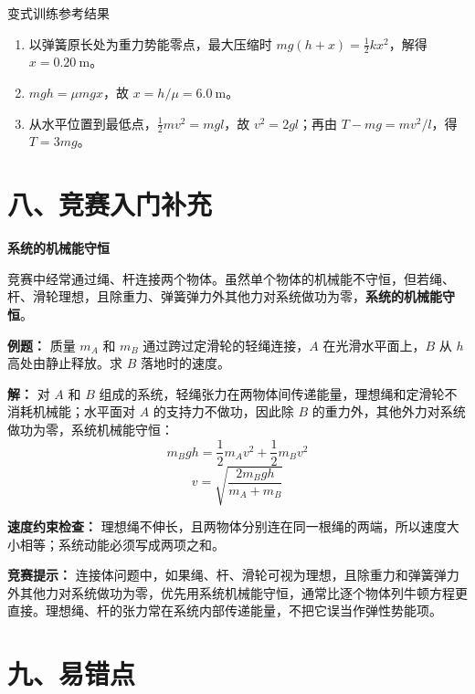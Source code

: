 \begin{learningbox}{变式训练参考结果}
\begin{enumerate}[itemsep=0.45em,topsep=0.3em,parsep=0pt]
  \item 以弹簧原长处为重力势能零点，最大压缩时
  $mg(h+x)=\frac12kx^2$，解得 $x=0.20\ \mathrm m$。
  \item $mgh=\mu mgx$，故 $x=h/\mu=6.0\ \mathrm m$。
  \item 从水平位置到最低点，$\frac12mv^2=mgl$，故 $v^2=2gl$；再由
  $T-mg=mv^2/l$，得 $T=3mg$。
\end{enumerate}
\end{learningbox}

\section*{八、竞赛入门补充}

\begin{competitionbox}
\textbf{系统的机械能守恒}

竞赛中经常通过绳、杆连接两个物体。虽然单个物体的机械能不守恒，但若绳、杆、滑轮理想，且除重力、弹簧弹力外其他力对系统做功为零，\textbf{系统的机械能守恒}。

\textbf{例题：} 质量 $m_A$ 和 $m_B$ 通过跨过定滑轮的轻绳连接，$A$ 在光滑水平面上，$B$ 从 $h$ 高处由静止释放。求 $B$ 落地时的速度。

\begin{center}


\label{fig:pulley-energy-system}
\end{center}

\textbf{解：} 对 $A$ 和 $B$ 组成的系统，轻绳张力在两物体间传递能量，理想绳和定滑轮不消耗机械能；水平面对 $A$ 的支持力不做功，因此除 $B$ 的重力外，其他外力对系统做功为零，系统机械能守恒：
\[
m_B g h = \frac12 m_A v^2 + \frac12 m_B v^2
\]
\[
v = \sqrt{\frac{2 m_B g h}{m_A + m_B}}
\]

\textbf{速度约束检查：} 理想绳不伸长，且两物体分别连在同一根绳的两端，所以速度大小相等；系统动能必须写成两项之和。

\textbf{竞赛提示：} 连接体问题中，如果绳、杆、滑轮可视为理想，且除重力和弹簧弹力外其他力对系统做功为零，优先用系统机械能守恒，通常比逐个物体列牛顿方程更直接。理想绳、杆的张力常在系统内部传递能量，不把它误当作弹性势能项。
\end{competitionbox}

\section*{九、易错点}

